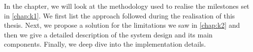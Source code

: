 In the chapter, we will look at the methodology used to realise the milestones set in \cref{chap:k1}. We first list the approach
followed during the realisation of this thesis. Next, we propose a solution for the limitations we saw in \cref{chap:k2} and then
we give a detailed description of the system design and its main components. Finally, we deep dive into the implementation details.



